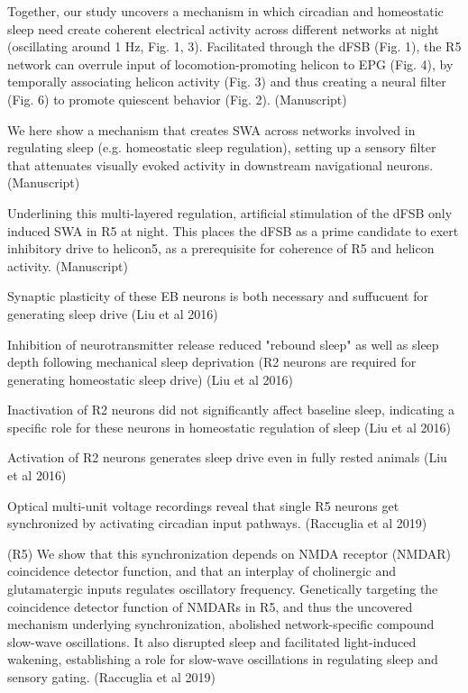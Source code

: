 Together, our study uncovers a mechanism in which circadian and homeostatic sleep need
create coherent electrical activity across different networks at night (oscillating around 1 Hz,
Fig. 1, 3). Facilitated through the dFSB (Fig. 1), the R5 network can overrule input of
locomotion-promoting helicon to EPG (Fig. 4), by temporally associating helicon activity (Fig.
3) and thus creating a neural filter (Fig. 6) to promote quiescent behavior (Fig. 2).
\cite{raccugliaCoherentMultilevelNetwork2022} (Manuscript)

We here show
a mechanism that creates SWA across networks involved in regulating sleep (e.g. homeostatic
sleep regulation), setting up a sensory filter that attenuates visually evoked activity in
downstream navigational neurons.
\cite{raccugliaCoherentMultilevelNetwork2022} (Manuscript)

Underlining this multi-layered regulation, artificial stimulation of the dFSB
only induced SWA in R5 at night. This places the dFSB as a prime candidate to exert inhibitory
drive to helicon5, as a prerequisite for coherence of R5 and helicon activity.
\cite{raccugliaCoherentMultilevelNetwork2022} (Manuscript)

Synaptic plasticity of these EB neurons is both necessary and suffucuent for generating sleep drive \cite{liuSleepDriveEncoded2016}
(Liu et al 2016)

Inhibition of neurotransmitter release reduced "rebound sleep" as well as sleep depth following mechanical sleep deprivation
(R2 neurons are required for generating homeostatic sleep drive) \cite{liuSleepDriveEncoded2016}
(Liu et al 2016)

Inactivation of R2 neurons did not significantly affect baseline sleep, indicating a specific role for these neurons in
homeostatic regulation of sleep \cite{liuSleepDriveEncoded2016}
(Liu et al 2016)

Activation of R2 neurons generates sleep drive even in fully rested animals \cite{liuSleepDriveEncoded2016}
    (Liu et al 2016)


Optical multi-unit voltage recordings reveal that single R5 neurons get synchronized by activating circadian input pathways.
\cite{raccugliaNetworkSpecificSynchronizationElectrical2019} (Raccuglia et al 2019)

(R5) We show that this synchronization depends on NMDA receptor (NMDAR) coincidence detector function, and that an interplay of cholinergic and glutamatergic inputs regulates oscillatory frequency.
Genetically targeting the coincidence detector function of NMDARs in R5, and thus the uncovered mechanism underlying synchronization, abolished network-specific compound slow-wave oscillations. It also disrupted sleep and facilitated light-induced wakening, establishing a role for slow-wave oscillations in regulating sleep and sensory gating.
\cite{raccugliaNetworkSpecificSynchronizationElectrical2019} (Raccuglia et al 2019)

